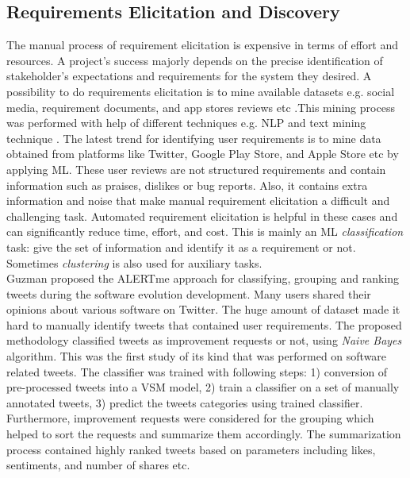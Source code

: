 \subsection{Requirements Elicitation and Discovery}

The manual process of requirement elicitation is expensive in terms of
effort and resources. A project's success majorly depends
on the precise identification of stakeholder's expectations and requirements for
the system they desired.
A possibility to do requirements elicitation is to mine available datasets e.g.
social media, requirement documents, and app stores reviews etc .This mining process was performed with help of different techniques e.g. NLP and text mining technique \cite{Hollis2017}\cite{dong2010}. The latest trend for
identifying user requirements is to mine data obtained from platforms like Twitter,
Google Play Store, and Apple Store etc by applying ML. These user reviews are not structured requirements
and contain information such as praises, dislikes or bug reports. Also, it contains extra information and noise that make manual requirement elicitation a difficult and challenging task.
Automated requirement elicitation is helpful in these cases and can
significantly reduce time, effort, and cost. This is mainly an ML
\emph{classification} task: give the set of information and identify it as a
requirement or not. Sometimes \emph{clustering} is also used for auxiliary
tasks.\\

Guzman \etal \cite{Guzman:2017} proposed the ALERTme approach for
classifying, grouping and ranking tweets during the software
evolution development. Many users shared their opinions about various software on Twitter. The huge amount of dataset made it hard to manually identify tweets that contained user requirements. The proposed methodology classified tweets as improvement requests or not, using \emph{Naive Bayes} algorithm. This was the first study of
its kind that was performed on software related tweets. 
The classifier was trained with following steps: 1) conversion of
pre-processed tweets into a VSM model, 2) train a classifier
on a set of manually annotated tweets, 3) predict the tweets categories using trained classifier. Furthermore, improvement
requests were considered for the grouping which helped to sort the
requests and summarize them accordingly. The summarization process contained highly ranked tweets based on parameters including likes, sentiments, and number of shares etc.\\

